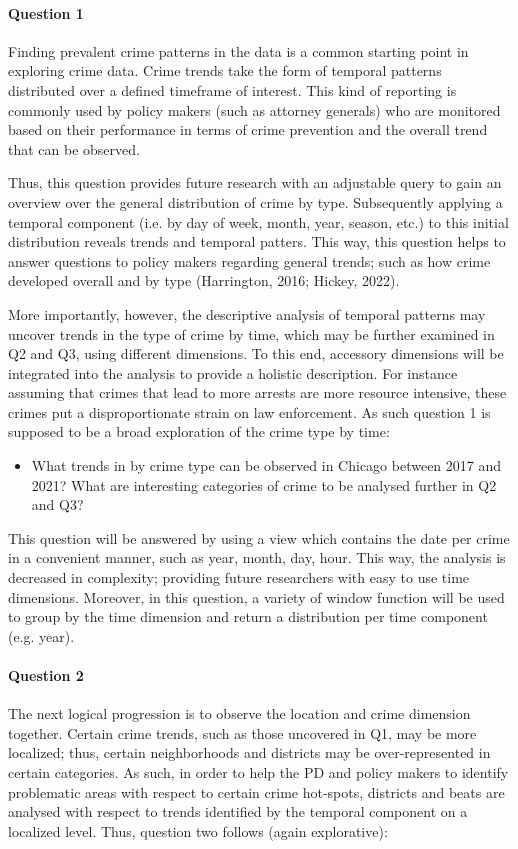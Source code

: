 \documentclass[a4paper]{article}
\begin{document}
\paragraph{Question 1} Finding prevalent crime patterns in the data is a common starting point in exploring crime data. Crime trends take the form of temporal patterns distributed over a defined timeframe of interest. This kind of reporting is commonly used by policy makers (such as attorney generals) who are monitored based on their performance in terms of crime prevention and the overall trend that can be observed. 

Thus, this question provides future research with an adjustable query to gain an overview over the general distribution of crime by type. Subsequently applying a temporal component (i.e. by day of week, month, year, season, etc.) to this initial distribution reveals trends and temporal patters. This way, this question helps to answer questions to policy makers regarding general trends; such as how crime developed overall and by type (Harrington, 2016; Hickey, 2022). 

More importantly, however, the descriptive analysis of temporal patterns may uncover trends in the type of crime by time, which may be further examined in Q2 and Q3, using different dimensions. To this end, accessory dimensions will be integrated into the analysis to provide a holistic description. For instance assuming that crimes that lead to more arrests are more resource intensive, these crimes put a disproportionate strain on law enforcement. As such question 1 is supposed to be a broad exploration of the crime type by time:

\begin{itemize}
	\item What trends in by crime type can be observed in Chicago between 2017 and 2021? What are interesting categories of crime to be analysed further in Q2 and Q3?
\end{itemize}

This question will be answered by using a view which contains the date per crime in a convenient manner, such as year, month, day, hour. This way, the analysis is decreased in complexity; providing future researchers with easy to use time dimensions. Moreover, in this question, a variety of window function will be used to group by the time dimension and return a distribution per time component (e.g. year). 

\paragraph{Question 2} The next logical progression is to observe the location and crime dimension together. Certain crime trends, such as those uncovered in Q1, may be more localized; thus, certain neighborhoods and districts may be over-represented in certain categories. As such, in order to help the PD and policy makers to identify problematic areas with respect to certain crime hot-spots, districts and beats are analysed with respect to trends identified by the temporal component on a localized level. Thus, question two follows (again explorative):
\end{document}
